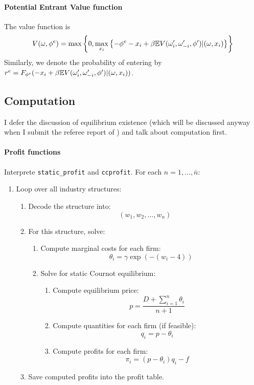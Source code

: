 \documentclass[12pt]{article}[margin=1in]
\begin{document}
\paragraph{Potential Entrant Value function} The value function is
\begin{equation*}
    V(\omega, \phi^e) = \max\left\{0,\max_{x_i}\left\{-\phi^e-x_i+\beta\mathbb{E}{V(\omega_i',\omega_{-i}',\phi')|(\omega, x_i)}\right\}\right\}
\end{equation*}
Similarly, we denote the probability of entering by $r^e=F_{\phi^e}(-x_i+\beta\mathbb{E}{V(\omega_i',\omega_{-i}',\phi')|(\omega, x_i)})$.

\subsection{Computation}
I defer the discussion of equilibrium existence (which will be discussed anyway when I submit the referee report of \citet{doraszelski2010computable}) and talk about computation first.

\paragraph{Profit functions} Interprete \verb|static_profit| and \verb|ccprofit|.
For each \(n = 1, \dots, \bar{n}\):
\begin{enumerate}
    \item Loop over all industry structures:
    \begin{enumerate}
        \item Decode the structure into:
        \[
        (w_1, w_2, \dots, w_n)
        \]
        \item For this structure, solve:
        \begin{enumerate}
            \item Compute marginal costs for each firm:
            \[
            \theta_i = \gamma \exp(-(w_i - 4))
            \]
            \item Solve for static Cournot equilibrium:
            \begin{enumerate}
                \item Compute equilibrium price:
                \[
                p = \frac{D + \sum_{i=1}^n \theta_i}{n+1}
                \]
                \item Compute quantities for each firm (if feasible):
                \[
                q_i = p - \theta_i
                \]
                \item Compute profits for each firm:
                \[
                \pi_i = (p - \theta_i)q_i - f
                \]
            \end{enumerate}
        \end{enumerate}
        \item Save computed profits into the profit table.
    \end{enumerate}
\end{enumerate}
\end{document}
